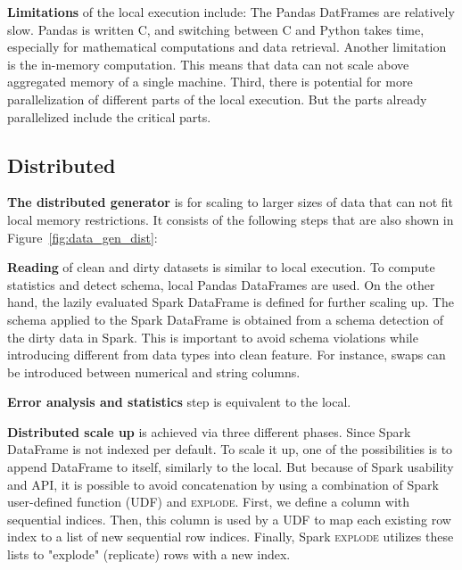 \textbf{Limitations} of the local execution include:
The Pandas DatFrames are relatively slow. Pandas is written C, and switching between C and Python takes time, especially for mathematical computations and data retrieval.
Another limitation is the in-memory computation. This means that data can not scale above aggregated memory of a single machine.
Third, there is potential for more parallelization of different parts of the local execution. But the parts already parallelized include the critical parts.


\subsection{Distributed}
\label{sec:distributed_generator}

\textbf{The distributed generator} is for scaling to larger sizes of data that can not fit local memory restrictions.
It consists of the following steps that are also shown in Figure~\ref{fig:data_gen_dist}:


\textbf{Reading} of clean and dirty datasets is similar to local execution. 
To compute statistics and detect schema, local Pandas DataFrames are used. 
On the other hand, the lazily evaluated Spark DataFrame is defined for further scaling up.
The schema applied to the Spark DataFrame is obtained from a schema detection of the dirty data in Spark.
This is important to avoid schema violations while introducing different from data types into clean feature.  
For instance, swaps can be introduced between numerical and string columns.

\textbf{Error analysis and statistics} step is equivalent to the local.

\textbf{Distributed scale up} is achieved via three different phases. 
Since Spark DataFrame is not indexed per default. 
To scale it up, one of the possibilities is to append DataFrame to itself, similarly to the local.
But because of Spark usability and API, it is possible to avoid concatenation by using a combination of Spark user-defined function (\textsc{UDF}) and \textsc{explode}.
First, we define a column with sequential indices. 
Then, this column is used by a \textsc{UDF} to map each existing row index to a list of new sequential row indices.
Finally, Spark \textsc{explode} utilizes these lists to "explode" (replicate) rows with a new index.


